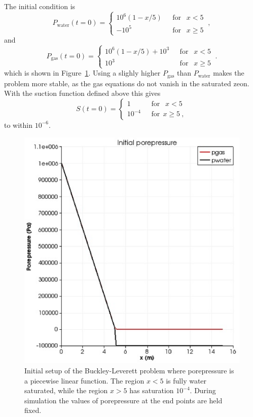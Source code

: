 \documentclass[]{scrreprt}
\begin{document}
The initial condition is
\begin{equation}
P_{\mathrm{water}}(t=0) = \left\{
\begin{array}{ll}
10^{6}(1-x/5) & \ \ \ \mbox{for }\ \ x<5 \\
-10^{5} & \ \ \ \mbox{for }\ \ x\geq 5  
\end{array}
\right. \ ,
\end{equation}
and
\begin{equation}
P_{\mathrm{gas}}(t=0) = \left\{
\begin{array}{ll}
10^{6}(1-x/5) + 10^{3} & \ \ \ \mbox{for }\ \ x<5 \\
10^{3} & \ \ \ \mbox{for }\ \ x\geq 5  
\end{array}
\right. \ .
\end{equation}
which is shown in Figure~\ref{bl2_setup.figa}.  Using a slighly higher
$P_{\mathrm{gas}}$ than $P_{\mathrm{water}}$ makes the problem more
stable, as the gas equations do not vanish in the saturated zeon.
With the suction function defined above this gives
\begin{equation}
S(t=0) = \left\{
\begin{array}{ll}
1 & \ \ \ \mbox{for }\ \ x < 5 \\
10^{-4} & \ \ \ \mbox{for} \ \ x \geq 5  \ ,
\end{array}
\right.
\end{equation}
to within $10^{-6}$.

\begin{figure}[htb]
\begin{center}
\includegraphics[width=12cm]{bl2_initial.eps}
\caption{Initial setup of the Buckley-Leverett problem where
  porepressure is a piecewise linear function.  The region
$x<5$ is fully water saturated, while the region $x>5$ has saturation
  $10^{-4}$.  During simulation the values of porepressure at the end
  points are held fixed.}
\label{bl2_setup.figa}
\end{center}
\end{figure}
\end{document}
